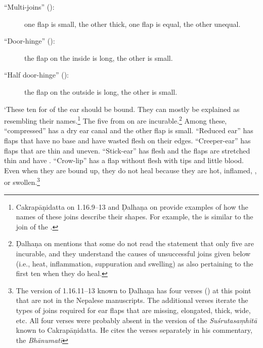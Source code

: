 \begin{translation}
\begin{description}
\item[\mdseries``Multi-joins'' ():]
        one flap is small, the other thick, one flap is equal, the other unequal.
        
\item[\mdseries``Door-hinge'' ():]
        the flap on the inside is long, the other is small.
        
\item[\mdseries``Half door-hinge'' ():]
        the flap on the outside is long, the other is small.
    \end{description}

`These ten  for  of the ear should be
bound.  They can mostly be explained as resembling their
names.\footnote{Cakrapāṇidatta on 1.16.9–13 \citep[128–129]{acar-1939} and Ḍalhaṇa
    on  provide examples of how the names of these joins describe
    their shapes. For example, the  is similar to the
    join of the .}  The five from
     on are incurable.\footnote{Ḍalhaṇa on
         mentions that some do not read the statement that only five
        are incurable, and they understand the causes of unsuccessful joins given below
        (i.e., heat, inflammation, suppuration and swelling) as also pertaining to the
        first ten when they do heal.}  Among these, “compressed” has a dry ear canal and
        the other flap is small.   “Reduced ear” has flaps that have no base and have
        wasted flesh on their edges. “Creeper-ear” has flaps that are thin and uneven.
        “Stick-ear” has  flesh and the flaps are stretched thin and
        have  .  “Crow-lip” has a flap without flesh
        with  tips and little blood. Even when they are bound
        up, they do not heal because they are hot, inflamed, , or
        swollen.\footnote{The version of 1.16.11–13 known to Ḍalhaṇa \citep[78]{vulgate}
            has four verses () at this point that are not in the Nepalese
            manuscripts. The additional verses iterate the types of joins required for ear
            flaps that are missing, elongated, thick, wide, etc. All four verses were probably
            absent in the version of the \emph{Suśrutasaṃhitā} known to Cakrapāṇidatta. He
            cites the verses separately in his commentary, the \emph{Bhānumatī}
}
\end{translation}
